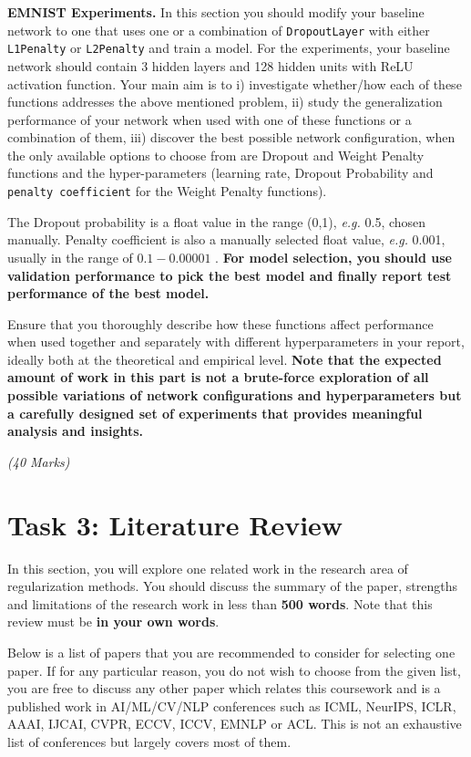 \documentclass[11pt,]{article}
\begin{document}
\textbf{EMNIST Experiments.}
In this section you should modify your baseline network to one that uses one or a combination of \texttt{DropoutLayer} with either \texttt{L1Penalty} or \texttt{L2Penalty} and train a model. 
For the experiments, your baseline network should contain 3 hidden layers and 128 hidden units with ReLU activation function.
Your main aim is to i) investigate whether/how each of these functions addresses the above mentioned problem, ii)
study the generalization performance of your network when used with one of these functions or a combination of them, iii) discover the best possible network configuration, when the only available options to choose from are Dropout and Weight Penalty functions and the hyper-parameters (learning rate, Dropout Probability and \texttt{penalty coefficient} for the Weight Penalty functions). 

The Dropout probability is a float value in the range (0,1), \textit{e.g.} 0.5, chosen manually. Penalty coefficient is also a manually selected float value, \textit{e.g.} 0.001, usually in the range of $0.1 - 0.00001$ .  
\textbf{For model selection, you should use validation performance to pick the best model and finally report test performance of the best model.}


Ensure that you thoroughly describe how these functions affect performance when used together and separately with different hyperparameters in your report, ideally both at the theoretical and empirical level. 
\textbf{Note that the expected amount of work in this part is not a brute-force exploration of all possible variations of network configurations and hyperparameters but a carefully designed set of experiments that provides meaningful analysis and insights.}

\emph{(40 Marks)}

\section{Task 3: Literature Review}
\label{sec:part3}

In this section, you will explore one related work in the research area of regularization methods. You should discuss the summary of the paper, strengths and limitations of the research work in less than \textbf{ 500 words}. Note that this review must be \textbf{in your own words}. 

Below is a list of papers that you are recommended to consider for selecting one paper. If for any particular reason, you do not wish to choose from the given list, you are free to discuss any other paper which relates this coursework and is a published work in AI/ML/CV/NLP conferences such as ICML, NeurIPS, ICLR, AAAI, IJCAI, CVPR, ECCV, ICCV, EMNLP or ACL. This is not an exhaustive list of conferences but largely covers most of them. 
\end{document}
